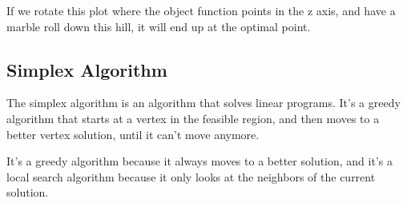 \documentclass[12pt]{article}
\begin{document}
\begin{example}
\begin{center}
    \end{center}
    If we rotate this plot where the object function points in the z axis, and have a marble roll down this hill, it will end up at the optimal point.
\end{example}
\subsection{Simplex Algorithm}
The simplex algorithm is an algorithm that solves linear programs. It's a greedy algorithm that starts at a vertex in the feasible region, and then moves to a better vertex solution, until it can't move anymore.

It's a greedy algorithm because it always moves to a better solution, and it's a local search algorithm because it only looks at the neighbors of the current solution.
\end{document}
